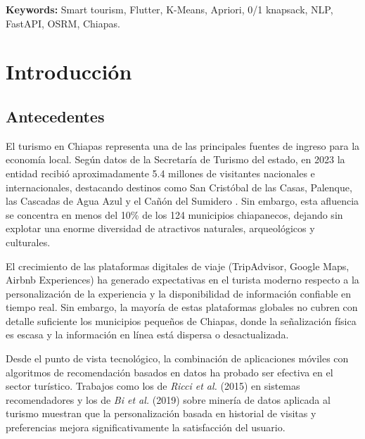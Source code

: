 \documentclass[12pt,letterpaper]{report}
\begin{document}
\bigskip
\noindent\textbf{Keywords:} Smart tourism, Flutter, K-Means, Apriori, 0/1 knapsack, NLP,
FastAPI, OSRM, Chiapas.

\tableofcontents
\listoftables
\listoffigures

\chapter{Introducción}

\section{Antecedentes}

El turismo en Chiapas representa una de las principales fuentes de ingreso para la economía
local. Según datos de la Secretaría de Turismo del estado, en 2023 la entidad recibió
aproximadamente 5.4 millones de visitantes nacionales e internacionales, destacando destinos
como San Cristóbal de las Casas, Palenque, las Cascadas de Agua Azul y el Cañón del Sumidero
\cite{sectur2023}. Sin embargo, esta afluencia se concentra en menos del 10\% de los 124
municipios chiapanecos, dejando sin explotar una enorme diversidad de atractivos naturales,
arqueológicos y culturales.

El crecimiento de las plataformas digitales de viaje (TripAdvisor, Google Maps, Airbnb
Experiences) ha generado expectativas en el turista moderno respecto a la personalización de la
experiencia y la disponibilidad de información confiable en tiempo real. Sin embargo, la
mayoría de estas plataformas globales no cubren con detalle suficiente los municipios pequeños
de Chiapas, donde la señalización física es escasa y la información en línea está dispersa
o desactualizada.

Desde el punto de vista tecnológico, la combinación de aplicaciones móviles con algoritmos de
recomendación basados en datos ha probado ser efectiva en el sector turístico. Trabajos como
los de \textit{Ricci et al.} (2015) en sistemas recomendadores y los de \textit{Bi et al.}
(2019) sobre minería de datos aplicada al turismo muestran que la personalización basada en
historial de visitas y preferencias mejora significativamente la satisfacción del usuario.
\end{document}
